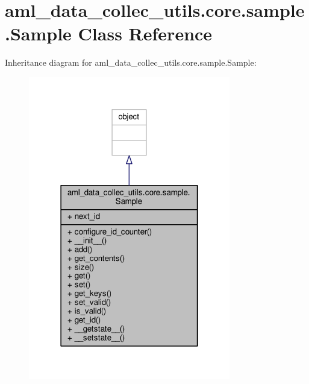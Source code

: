 \hypertarget{classaml__data__collec__utils_1_1core_1_1sample_1_1_sample}{\section{aml\-\_\-data\-\_\-collec\-\_\-utils.\-core.\-sample.\-Sample Class Reference}
\label{classaml__data__collec__utils_1_1core_1_1sample_1_1_sample}
}


Inheritance diagram for aml\-\_\-data\-\_\-collec\-\_\-utils.\-core.\-sample.\-Sample\-:\nopagebreak
\begin{figure}[H]
\begin{center}
\leavevmode
\includegraphics[width=250pt]{classaml__data__collec__utils_1_1core_1_1sample_1_1_sample__inherit__graph}
\end{center}
\end{figure}


